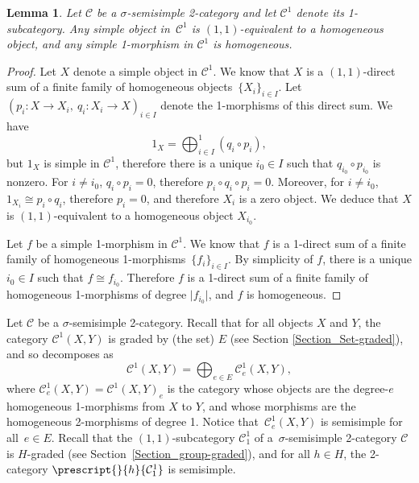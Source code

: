 \documentclass[a4paper, oneside]{amsart}
\numberwithin{equation}{subsection}
\theoremstyle{referencedlemma}
\theoremstyle{plain} %
\newtheorem{lem}[equation]{Lemma}
\theoremstyle{remark}
\begin{document}
\begin{lem}
Let $\mathcal{C}$ be a $\sigma$-semisimple 2-category and let $\mathcal{C}^1$ denote its 1-subcategory. Any simple object in~$\mathcal{C}^1$ is $(1,1)$-equivalent to a homogeneous object, and any simple 1-morphism in $\mathcal{C}^1$ is homogeneous.
\end{lem}
\begin{proof}
Let $X$ denote a simple object in $\mathcal{C}^1$.  We know that $X$ is a $(1,1)$-direct sum of a finite family of homogeneous objects~$\{X_i\}_{i\in I}$. Let $(p_i \colon X\to X_i, \ q_i\colon X_i\to X)_{i\in I}$ denote the 1-morphisms of this direct sum.  We have 
$$
1_X = \bigoplus^1_{i\in I} (q_i\circ p_i),
$$
 but $1_X$ is simple in $\mathcal{C}^1$, therefore there is a unique $i_0 \in I$ such that $q_{i_0}\circ p_{i_0}$ is nonzero.  For $i\neq i_0$, $q_i \circ p_i = 0$, therefore $p_i\circ q_i \circ p_i = 0$. Moreover, for $i\neq i_0$, $1_{X_i} \cong p_i\circ q_i$, therefore $p_i = 0$, and therefore $X_i$ is a zero object.  We deduce that $X$ is $(1,1)$-equivalent to a homogeneous object $X_{i_0}$. 
 
Let $f$ be a simple 1-morphism in $\mathcal{C}^1$.  We know that $f$ is a 1-direct sum of a finite family of homogeneous 1-mor\-phisms~$\{f_i\}_{i\in I}$.  By simplicity of $f$, there is a unique $i_0\in I$ such that $f\cong f_{i_0}$. Therefore $f$ is a 1-direct sum of a finite family of homogeneous 1-morphisms of degree $\lvert  f_{i_0}\rvert$, and $f$ is homogeneous. 
\end{proof}

Let $\mathcal{C}$ be a $\sigma$-semisimple 2-category.  Recall that for all objects $X$ and $Y$, the category $\mathcal{C}^1(X,Y)$ is graded by (the set) $E$ (see Section \ref{Section_Set-graded}), and so decomposes as
$$
\mathcal{C}^1(X,Y) = \bigoplus_{e\in E} \mathcal{C}^1_e(X,Y),
$$
where $\mathcal{C}^1_e(X,Y) = \mathcal{C}^1(X,Y)_e$ is the category whose objects are the degree-$e$ homogeneous 1-morphisms from $X$ to $Y$, and whose morphisms are the homogeneous 2-morphisms of degree 1. 
Notice that~$\mathcal{C}^1_e(X,Y)$ is semisimple for all~\mbox{$e\in E$.} Recall that the $(1,1)$-subcategory $\mathcal{C}_1^1$ of a~$\sigma$-semisimple 2-category $\mathcal{C}$ is $H$-graded (see Section~\ref{Section_group-graded}), and for all $h\in H$, the 2-category $\prescript{}{h}{\mathcal{C}_1^1}$ is semisimple. 
\end{document}
